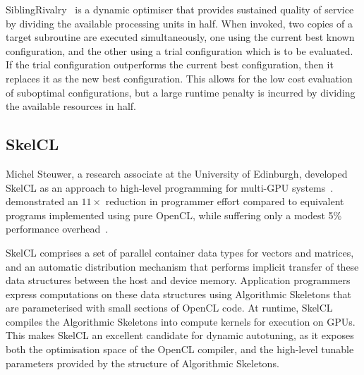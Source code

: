 SiblingRivalry~\cite{Ansel2012} is a dynamic optimiser that provides
sustained quality of service by dividing the available processing
units in half. When invoked, two copies of a target subroutine are
executed simultaneously, one using the current best known
configuration, and the other using a trial configuration which is to
be evaluated. If the trial configuration outperforms the current best
configuration, then it replaces it as the new best configuration. This
allows for the low cost evaluation of suboptimal configurations, but a
large runtime penalty is incurred by dividing the available resources
in half.

\subsection{SkelCL}
Michel Steuwer, a research associate at the University of Edinburgh,
developed SkelCL as an approach to high-level programming for
multi-GPU systems~\cite{Steuwer2011,
  Steuwer2013a}. \citeauthor{Steuwer2012} demonstrated an $11\times$
reduction in programmer effort compared to equivalent programs
implemented using pure OpenCL, while suffering only a modest 5\%
performance overhead~\cite{Steuwer2012}.

SkelCL comprises a set of parallel container data types for vectors
and matrices, and an automatic distribution mechanism that performs
implicit transfer of these data structures between the host and device
memory. Application programmers express computations on these data
structures using Algorithmic Skeletons that are parameterised with
small sections of OpenCL code. At runtime, SkelCL compiles the
Algorithmic Skeletons into compute kernels for execution on GPUs. This
makes SkelCL an excellent candidate for dynamic autotuning, as it
exposes both the optimisation space of the OpenCL compiler, and the
high-level tunable parameters provided by the structure of Algorithmic
Skeletons.
